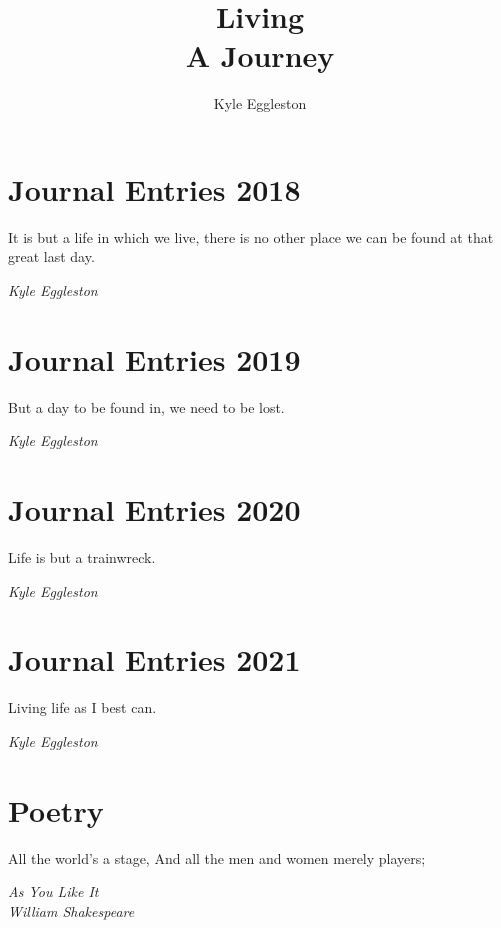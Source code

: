 \documentclass{book}
\title{%
  Living \\
  \large A Journey}
\author{Kyle Eggleston}
\begin{document}
\maketitle
\thispagestyle{empty}

\frontmatter

\tableofcontents

\listoftables

\listoffigures

\newpage



\mainmatter

\chapter{Journal Entries 2018}
\epigraph{It is but a life in which we live, there is no other place we can be
found at that great last day.}{\textit{Kyle Eggleston}}



\chapter{Journal Entries 2019}
\epigraph{But a day to be found in, we need to be lost.}{\textit{Kyle Eggleston}}


\chapter{Journal Entries 2020}
\epigraph{Life is but a trainwreck.}{\textit{Kyle Eggleston}}


\chapter{Journal Entries 2021}
\epigraph{Living life as I best can.}{\textit{Kyle Eggleston}}


\chapter{Poetry}
\epigraph{All the world's a stage, And all the men and women merely players;}
{\textit{As You Like It \\ William Shakespeare}}


\backmatter
\printbibliography
\end{document}
